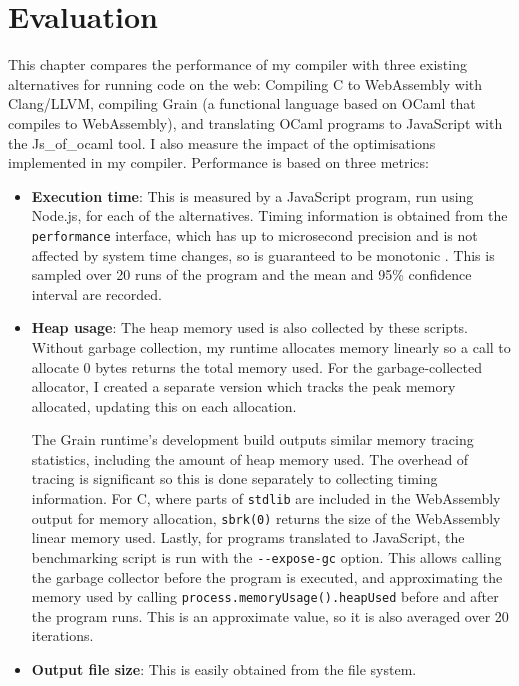 \chapter{Evaluation}
This chapter compares the performance of my compiler with three existing alternatives for running code on the web: Compiling C to WebAssembly with Clang/LLVM, compiling Grain (a functional language based on OCaml that compiles to WebAssembly), and translating OCaml programs to JavaScript with the Js\_of\_ocaml tool.
I also measure the impact of the optimisations implemented in my compiler. Performance is based on three metrics: 

\begin{itemize}
\item \textbf{Execution time}: This is measured by a JavaScript program, run using Node.js, for each of the alternatives. Timing information is obtained from the \verb|performance| interface, which has up to microsecond precision and is not affected by system time changes, so is guaranteed to be monotonic \cite{timing}. This is sampled over 20 runs of the program and the mean and 95\% confidence interval are recorded. 

\item \textbf{Heap usage}: The heap memory used is also collected by these scripts. Without garbage collection, my runtime allocates memory linearly so a call to allocate 0 bytes returns the total memory used. For the garbage-collected allocator, I created a separate version which tracks the peak memory allocated, updating this on each allocation. 

The Grain runtime's development build outputs similar memory tracing statistics, including the amount of heap memory used. 
The overhead of tracing is significant so this is done separately to collecting timing information. For C, where parts of \verb|stdlib| are included in the WebAssembly output for memory allocation, \verb|sbrk(0)| returns the size of the WebAssembly linear memory used. 
Lastly, for programs translated to JavaScript, the benchmarking script is run with the \verb|--expose-gc| option. This allows calling the garbage collector before the program is executed, and approximating the memory used by calling \verb|process.memoryUsage().heapUsed| before and after the program runs. This is an approximate value, so it is also averaged over 20 iterations.

\item \textbf{Output file size}: This is easily obtained from the file system.

\end{itemize}

